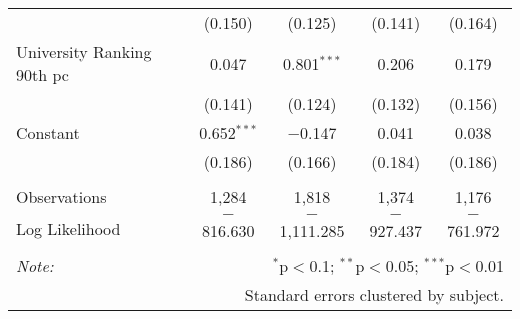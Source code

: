 \begin{table}[!htbp]
\begin{tabular}{@{\extracolsep{5pt}}lcccc}
  & (0.150) & (0.125) & (0.141) & (0.164) \\ 
  University Ranking 90th pc & 0.047 & 0.801$^{***}$ & 0.206 & 0.179 \\ 
  & (0.141) & (0.124) & (0.132) & (0.156) \\ 
  Constant & 0.652$^{***}$ & $-$0.147 & 0.041 & 0.038 \\ 
  & (0.186) & (0.166) & (0.184) & (0.186) \\ 
 \hline \\[-1.8ex] 
Observations & 1,284 & 1,818 & 1,374 & 1,176 \\ 
Log Likelihood & $-$816.630 & $-$1,111.285 & $-$927.437 & $-$761.972 \\ 
\hline 
\hline \\[-1.8ex] 
\textit{Note:}  & \multicolumn{4}{r}{$^{*}$p$<$0.1; $^{**}$p$<$0.05; $^{***}$p$<$0.01} \\ 
 & \multicolumn{4}{r}{Standard errors clustered by subject.} \\ 
\end{tabular} 
\end{table} 

